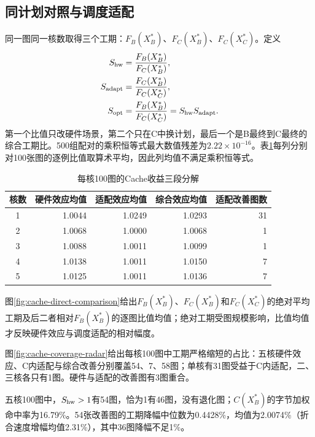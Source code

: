 \subsection{同计划对照与调度适配}
同一图同一核数取得三个工期：$F_B(X_B^*)$、$F_C(X_B^*)$、$F_C(X_C^*)$。定义
\begin{equation}
\begin{split}
S_{\rm hw}&=\frac{F_B(X_B^*)}{F_C(X_B^*)},\\
S_{\rm adapt}&=\frac{F_C(X_B^*)}{F_C(X_C^*)},\\
S_{\rm opt}&=\frac{F_B(X_B^*)}{F_C(X_C^*)}=S_{\rm hw}S_{\rm adapt}.
\end{split}
\label{eq:cache-factors}
\end{equation}
第一个比值只改硬件场景，第二个只在C中换计划，最后一个是B最终到C最终的综合工期比。500组配对的乘积恒等式最大数值残差为$2.22\times10^{-16}$。表\ref{tab:cache-factors}每列分别对100张图的逐例比值取算术平均，因此列均值不满足乘积恒等式。
\begin{table}[H]\centering\caption{每核100图的Cache收益三段分解}\label{tab:cache-factors}
\begin{tabular}{crrrr}\toprule
核数 & 硬件效应均值 & 适配效应均值 & 综合效应均值 & 适配改善图数\\\midrule
1 & 1.0044 & 1.0249 & 1.0293 & 31\\
2 & 1.0068 & 1.0000 & 1.0068 & 1\\
3 & 1.0088 & 1.0011 & 1.0099 & 1\\
4 & 1.0138 & 1.0011 & 1.0150 & 7\\
5 & 1.0125 & 1.0011 & 1.0136 & 7\\\bottomrule
\end{tabular}\end{table}
图\ref{fig:cache-direct-comparison}给出$F_B(X_B^*)$、$F_C(X_B^*)$和$F_C(X_C^*)$的绝对平均工期及后二者相对$F_B(X_B^*)$的逐图比值均值；绝对工期受图规模影响，比值均值才反映硬件效应与调度适配的相对幅度。

图\ref{fig:cache-coverage-radar}给出每核100图中工期严格缩短的占比：五核硬件效应、C内适配与综合改善分别覆盖54、7、58图；单核有31图受益于C内适配，二、三核各只有1图。硬件与适配的改善图有3图重合。

五核100图中，$S_{\rm hw}>1$有54图，恰为1有46图，没有退化图；$C(X_B^*)$的字节加权命中率为16.79\%。54张改善图的工期降幅中位数为0.4428\%，均值为2.0074\%（折合速度增幅均值2.31\%），其中36图降幅不足1\%。

